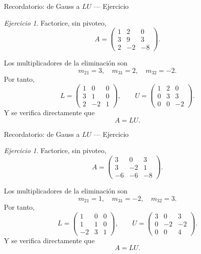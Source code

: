 \documentclass[aspectratio=169,11pt]{beamer}
\theoremstyle{remark}
\newtheorem{Ejer}[definicion]{Ejercicio}
\begin{document}
\begin{frame}[shrink=5]{Recordatorio: de Gauss a $LU$ — Ejercicio}
\footnotesize
\begin{Ejer} Factorice, sin pivoteo,
\[
A=\begin{pmatrix}1 & 2 & 0\\3 & 9 & 3\\2 & -2 & -8\end{pmatrix}.
\]

Los multiplicadores de la eliminación son
\[
m_{21}=3,\quad m_{31}=2,\quad m_{32}=-2.
\]
Por tanto,
\[
L=\begin{pmatrix}1 & 0 & 0\\3 & 1 & 0\\2 & -2 & 1\end{pmatrix},\qquad U=\begin{pmatrix}1 & 2 & 0\\0 & 3 & 3\\0 & 0 & -2\end{pmatrix}.
\]
Y se verifica directamente que
\[
\boxed{A=LU}.
\]
\end{Ejer}
\end{frame}

\begin{frame}[shrink=5]{Recordatorio: de Gauss a $LU$ — Ejercicio}
\footnotesize
\begin{Ejer}
Factorice, sin pivoteo,
\[
A=\begin{pmatrix}3 & 0 & 3\\3 & -2 & 1\\-6 & -6 & -8\end{pmatrix}.
\]

 Los multiplicadores de la eliminación son
\[
m_{21}=1,\quad m_{31}=-2,\quad m_{32}=3.
\]
Por tanto,
\[
L=\begin{pmatrix}1 & 0 & 0\\1 & 1 & 0\\-2 & 3 & 1\end{pmatrix},\qquad U=\begin{pmatrix}3 & 0 & 3\\0 & -2 & -2\\0 & 0 & 4\end{pmatrix}.
\]
Y se verifica directamente que
\[
\boxed{A=LU}.
\]
\end{Ejer}
\end{frame}
\end{document}
